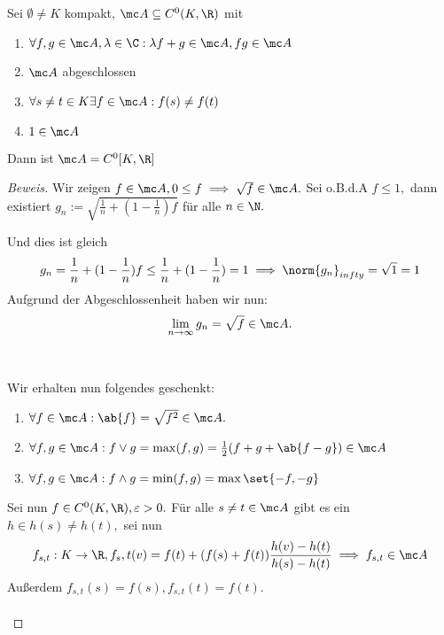 \begin{theorem} \label{algebraquatsch} Sei $\emptyset \not= K$ kompakt, $\mc A \subseteq C^0(K, \R)$ mit 
	
	\begin{enumerate}
		
		\item $\forall f, g \in \mc A, \lambda \in \C: \lambda f +g \in \mc A, fg \in \mc A$
		
		\item $\mc A$ abgeschlossen
		
		\item $\forall s \not= t \in K \exists f \in \mc A: f(s) \not= f(t)$
		
		\item $1 \in \mc A$
		
	\end{enumerate}
	
	Dann ist $\mc A = C^0[K, \R]$
	
	\begin{proof}[Beweis] Wir zeigen $f \in \mc A, 0 \leq f \implies \sqrt{f} \in \mc A.$ Sei o.B.d.A $f \leq 1,$ dann existiert $g_n := \sqrt{\frac{1}{n}+(1- \frac{1}{n})f}$ für alle $n \in \N.$
		
		 Und dies ist gleich \[g_n = \frac{1}{n}+ (1- \frac{1}{n})f \leq \frac{1}{n}+(1- \frac{1}{n}) = 1 \implies \norm{g_n}_{infty} = \sqrt{1} = 1\] Aufgrund der Abgeschlossenheit haben wir nun: \[\lim_{n \to \infty} g_n = \sqrt{f} \in \mc A.\] \\ \\
		
		Wir erhalten nun folgendes geschenkt:
		
		\begin{enumerate}
			
			\item $\forall f \in \mc A: \ab{f} = \sqrt{f^2} \in \mc A.$
			\item $\forall f, g \in \mc A: f \lor g = \max(f, g) = \frac{1}{2}(f+g+ \ab{f-g}) \in \mc A$
			\item $\forall f, g \in \mc A: f \land g = \min(f, g) = \max{\set{-f, -g}}$
			
		\end{enumerate}
		
		Sei nun $f \in C^0(K, \R), \varepsilon > 0.$ Für alle $s \not= t \in \mc A$ gibt es ein $h \in h(s) \not= h(t),$ sei nun \[f_{s, t}: K \to \R, f_s,t(v) = f(t)+(f(s)+f(t))\frac{h(v)-h(t)}{h(s)-h(t)} \implies f_{s, t} \in \mc A\] Außerdem $f_{s, t}(s) = f(s), f_{s, t}(t) = f(t).$ \\ \\
		

\end{proof}
\end{theorem}
